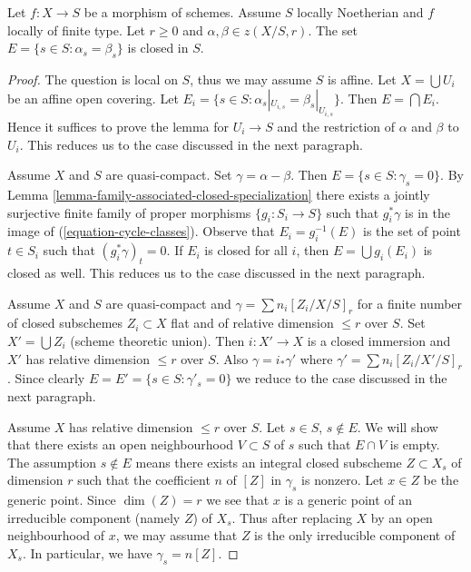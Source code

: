 \begin{lemma}
\label{lemma-relative-cycles-equal}
Let $f : X \to S$ be a morphism of schemes. Assume $S$ locally Noetherian
and $f$ locally of finite type. Let $r \geq 0$ and
$\alpha, \beta \in z(X/S, r)$. The set $E = \{s \in S : \alpha_s = \beta_s\}$
is closed in $S$.
\end{lemma}

\begin{proof}
The question is local on $S$, thus we may assume $S$ is affine.
Let $X = \bigcup U_i$ be an affine open covering. Let
$E_i = \{s \in S : \alpha_s|_{U_{i, s}} = \beta_s|_{U_{i, s}}\}$.
Then $E = \bigcap E_i$. Hence it suffices to prove the lemma for
$U_i \to S$ and the restriction of $\alpha$ and $\beta$ to $U_i$.
This reduces us to the case discussed in the next paragraph.

\medskip\noindent
Assume $X$ and $S$ are quasi-compact.
Set $\gamma = \alpha - \beta$. Then $E = \{s \in S : \gamma_s = 0\}$.
By Lemma \ref{lemma-family-associated-closed-specialization}
there exists a jointly surjective finite family of proper morphisms
$\{g_i : S_i \to S\}$ such that $g_i^*\gamma$ is in the image
of (\ref{equation-cycle-classes}). Observe that $E_i = g_i^{-1}(E)$ is
the set of point $t \in S_i$ such that $(g_i^*\gamma)_t = 0$.
If $E_i$ is closed for all $i$, then $E = \bigcup g_i(E_i)$
is closed as well. This reduces us to the case discussed in the next
paragraph.

\medskip\noindent
Assume $X$ and $S$ are quasi-compact and $\gamma = \sum n_i[Z_i/X/S]_r$
for a finite number of closed subschemes $Z_i \subset X$
flat and of relative dimension $\leq r$ over $S$.
Set $X' = \bigcup Z_i$ (scheme theoretic union).
Then $i : X' \to X$ is a closed immersion and $X'$
has relative dimension $\leq r$ over $S$. Also
$\gamma = i_*\gamma'$ where $\gamma' = \sum n_i[Z_i/X'/S]_r$.
Since clearly $E = E' = \{s \in S : \gamma'_s = 0\}$
we reduce to the case discussed in the next paragraph.

\medskip\noindent
Assume $X$ has relative dimension $\leq r$ over $S$.
Let $s \in S$, $s \not \in E$. We will show that there exists an
open neighbourhood $V \subset S$ of $s$ such that $E \cap V$ is empty.
The assumption $s \not \in E$ means there exists an integral closed
subscheme $Z \subset X_s$ of dimension $r$ such that the coefficient
$n$ of $[Z]$ in $\gamma_s$ is nonzero. Let $x \in Z$ be the
generic point. Since $\dim(Z) = r$ we see that $x$ is a generic
point of an irreducible component (namely $Z$) of $X_s$.
Thus after replacing $X$ by an open neighbourhood of $x$,
we may assume that $Z$ is the only irreducible component of $X_s$.
In particular, we have $\gamma_s = n[Z]$.


\end{proof}
